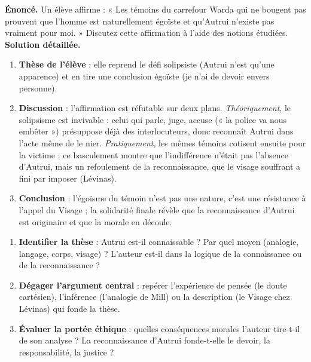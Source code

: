 \documentclass[11pt]{article}
\begin{document}
\begin{exoresolu}
\textbf{Énoncé.} Un élève affirme : « Les témoins du carrefour Warda qui ne bougent pas prouvent que l'homme est naturellement égoïste et qu'Autrui n'existe pas vraiment pour moi. » Discutez cette affirmation à l'aide des notions étudiées.
\tcblower
\textbf{Solution détaillée.}
\begin{enumerate}
\item \textbf{Thèse de l'élève} : elle reprend le défi solipsiste (Autrui n'est qu'une apparence) et en tire une conclusion égoïste (je n'ai de devoir envers personne).
\item \textbf{Discussion} : l'affirmation est réfutable sur deux plans. \emph{Théoriquement}, le solipsisme est invivable : celui qui parle, juge, accuse (« la police va nous embêter ») présuppose déjà des interlocuteurs, donc reconnaît Autrui dans l'acte même de le nier. \emph{Pratiquement}, les mêmes témoins cotisent ensuite pour la victime : ce basculement montre que l'indifférence n'était pas l'absence d'Autrui, mais un refoulement de la reconnaissance, que le visage souffrant a fini par imposer (Lévinas).
\item \textbf{Conclusion} : l'égoïsme du témoin n'est pas une nature, c'est une résistance à l'appel du Visage ; la solidarité finale révèle que la reconnaissance d'Autrui est originaire et que la morale en découle.
\end{enumerate}
\end{exoresolu}

\begin{methode}
\begin{enumerate}
\item \textbf{Identifier la thèse} : Autrui est-il connaissable ? Par quel moyen (analogie, langage, corps, visage) ? L'auteur est-il dans la logique de la connaissance ou de la reconnaissance ?
\item \textbf{Dégager l'argument central} : repérer l'expérience de pensée (le doute cartésien), l'inférence (l'analogie de Mill) ou la description (le Visage chez Lévinas) qui fonde la thèse.
\item \textbf{Évaluer la portée éthique} : quelles conséquences morales l'auteur tire-t-il de son analyse ? La reconnaissance d'Autrui fonde-t-elle le devoir, la responsabilité, la justice ?
\end{enumerate}
\end{methode}
\end{document}
